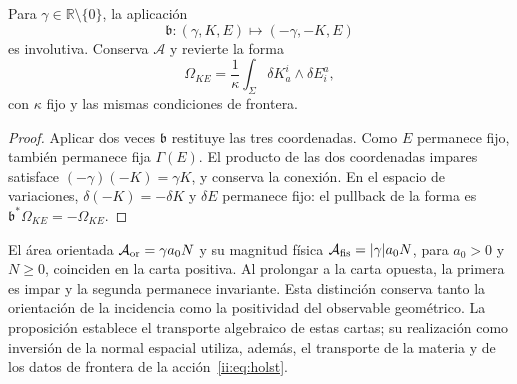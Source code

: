 \begin{proposition}
\label{ii:prop:ii-costura-barbero}
Para \(\gamma\in\mathbb R\setminus\{0\}\), la aplicación
\[
 \mathfrak b:(\gamma,K,E)\longmapsto(-\gamma,-K,E)
\]
es involutiva. Conserva \(\mathcal A\) y revierte la forma
\[
 \Omega_{KE}=\frac1\kappa\int_\Sigma
 \delta K_a^i\wedge\delta E^a_i,
\]
con \(\kappa\) fijo y las mismas condiciones de frontera.
\end{proposition}
\begin{proof}
Aplicar dos veces \(\mathfrak b\) restituye las tres coordenadas.
Como \(E\) permanece fijo, también permanece fija \(\Gamma(E)\).
El producto de las dos coordenadas impares satisface
\((-\gamma)(-K)=\gamma K\), y conserva la conexión.
En el espacio de variaciones, \(\delta(-K)=-\delta K\) y
\(\delta E\) permanece fijo: el pullback de la forma es
\(\mathfrak b^*\Omega_{KE}=-\Omega_{KE}\).
\end{proof}

El área orientada \(\mathcal A_{\rm or}=\gamma a_0N\) y su
magnitud física \(\mathcal A_{\rm fis}=|\gamma|a_0N\), para
\(a_0>0\) y \(N\geq0\), coinciden en la carta positiva.
Al prolongar a la carta opuesta, la primera es impar y la segunda
permanece invariante. Esta distinción conserva tanto la orientación
de la incidencia como la positividad del observable geométrico.
La proposición establece el transporte algebraico de estas cartas;
su realización como inversión de la normal espacial utiliza,
además, el transporte de la materia y de los datos de frontera
de la acción~\eqref{ii:eq:holst}.
